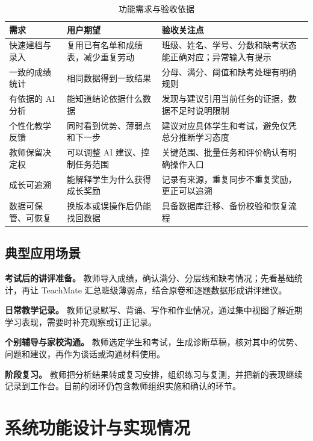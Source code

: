 \documentclass[11pt,a4paper,fontset=none]{ctexart}
\begin{document}
\begin{table}[htbp]
\centering
\small
\begin{tabularx}{\textwidth}{@{}L{3.1cm}YY@{}}
\toprule
\textbf{需求} & \textbf{用户期望} & \textbf{验收关注点} \\
\midrule
快速建档与录入 & 复用已有名单和成绩表，减少重复劳动 & 班级、姓名、学号、分数和缺考状态能正确对应；异常输入有提示 \\
一致的成绩统计 & 相同数据得到一致结果 & 分母、满分、阈值和缺考处理有明确规则 \\
有依据的 AI 分析 & 能知道结论依据什么数据 & 发现与建议引用当前任务的证据，数据不足时说明限制 \\
个性化教学反馈 & 同时看到优势、薄弱点和下一步 & 建议对应具体学生和考试，避免仅凭总分推断学习态度 \\
教师保留决定权 & 可以调整 AI 建议、控制任务范围 & 关键范围、批量任务和评价确认有明确操作入口 \\
成长可追溯 & 能解释学生为什么获得成长奖励 & 记录有来源，重复同步不重复奖励，更正可以追溯 \\
数据可保管、可恢复 & 换版本或误操作后仍能找回数据 & 具备数据库迁移、备份校验和恢复流程 \\
\bottomrule
\end{tabularx}
\caption{功能需求与验收依据}
\end{table}

\subsection{典型应用场景}

\textbf{考试后的讲评准备。} 教师导入成绩，确认满分、分层线和缺考情况；先看基础统计，再让 TeachMate 汇总班级薄弱点，结合原卷和逐题数据形成讲评建议。

\textbf{日常教学记录。} 教师记录默写、背诵、写作和作业情况，通过集中视图了解近期学习表现，需要时补充观察或订正记录。

\textbf{个别辅导与家校沟通。} 教师选定学生和考试，生成诊断草稿，核对其中的优势、问题和建议，再作为谈话或沟通材料使用。

\textbf{阶段复习。} 教师把分析结果转成复习安排，组织练习与复测，并把新的表现继续记录到工作台。目前的闭环仍包含教师组织实施和确认的环节。

\section{系统功能设计与实现情况}
\end{document}

